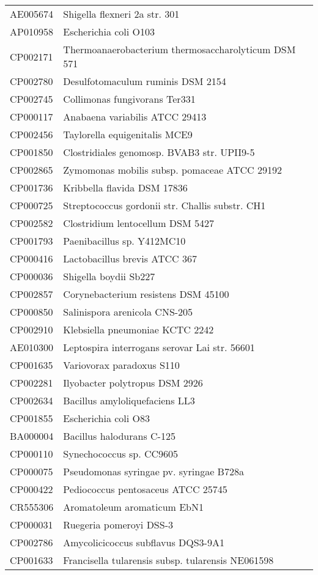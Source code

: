 \begin{longtable}{ll}
AE005674 & Shigella flexneri 2a str. 301\\
AP010958 & Escherichia coli O103\\
CP002171 & Thermoanaerobacterium thermosaccharolyticum DSM 571\\
CP002780 & Desulfotomaculum ruminis DSM 2154\\
CP002745 & Collimonas fungivorans Ter331\\
CP000117 & Anabaena variabilis ATCC 29413\\
CP002456 & Taylorella equigenitalis MCE9\\
CP001850 & Clostridiales genomosp. BVAB3 str. UPII9-5\\
CP002865 & Zymomonas mobilis subsp. pomaceae ATCC 29192\\
CP001736 & Kribbella flavida DSM 17836\\
CP000725 & Streptococcus gordonii str. Challis substr. CH1\\
CP002582 & Clostridium lentocellum DSM 5427\\
CP001793 & Paenibacillus sp. Y412MC10\\
CP000416 & Lactobacillus brevis ATCC 367\\
CP000036 & Shigella boydii Sb227\\
CP002857 & Corynebacterium resistens DSM 45100\\
CP000850 & Salinispora arenicola CNS-205\\
CP002910 & Klebsiella pneumoniae KCTC 2242\\
AE010300 & Leptospira interrogans serovar Lai str. 56601\\
CP001635 & Variovorax paradoxus S110\\
CP002281 & Ilyobacter polytropus DSM 2926\\
CP002634 & Bacillus amyloliquefaciens LL3\\
CP001855 & Escherichia coli O83\\
BA000004 & Bacillus halodurans C-125\\
CP000110 & Synechococcus sp. CC9605\\
CP000075 & Pseudomonas syringae pv. syringae B728a\\
CP000422 & Pediococcus pentosaceus ATCC 25745\\
CR555306 & Aromatoleum aromaticum EbN1\\
CP000031 & Ruegeria pomeroyi DSS-3\\
CP002786 & Amycolicicoccus subflavus DQS3-9A1\\
CP001633 & Francisella tularensis subsp. tularensis NE061598\\

\end{longtable}
